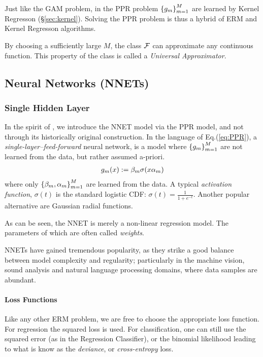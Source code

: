 \begin{remark}
Just like the GAM problem, in the PPR problem $\left\{ g_m \right\}_{m=1}^M$ are learned by Kernel Regresson (\S\ref{sec:kernel}). Solving the PPR problem is thus a hybrid of ERM and Kernel Regresson algorithms.
\end{remark}

\begin{remark}
By choosing a sufficiently large $M$, the class $\mathcal{F}$ can approximate any continuous function. This property of the class is called a \emph{Universal Approximator}.
\end{remark}




\subsection{Neural Networks (NNETs)}
\subsubsection{Single Hidden Layer}
In the spirit of \cite[Section 11]{hastie_elements_2003}, we introduce the NNET model via the PPR model, and not through its historically original construction.
In the language of Eq.(\ref{eq:PPR}), a \emph{single-layer--feed-forward }neural network, is a model where $\left\{ g_m \right\}_{m=1}^M$  are not learned from the data, but rather assumed a-priori. 
\begin{align*}
	g_m(x):= \beta_m \sigma( x \alpha_m  )
\end{align*}
where only $\left\{ \beta_m, \alpha_m \right\}_{m=1}^M$ are learned from the data. 
A typical \emph{activation function}, $\sigma(t)$ is the standard logistic CDF: $\sigma(t)=\frac{1}{1+e^{-t}}$. Another popular alternative are Gaussian radial functions.

As can be seen, the NNET is merely a non-linear regression model.
The parameters of which are often called \emph{weights}.

NNETs have gained tremendous popularity, as they strike a good balance between model complexity and regularity; particularly in the machine vision, sound analysis and natural language processing domains, where data samples are abundant.

\paragraph{Loss Functions}
Like any other ERM problem, we are free to choose the appropriate loss function.
For regression the squared loss is used. For classification, one can still use the squared error (as in the Regression Classifier), or the binomial likelihood leading to what is know as the \emph{deviance}, or \emph{cross-entropy} loss.

